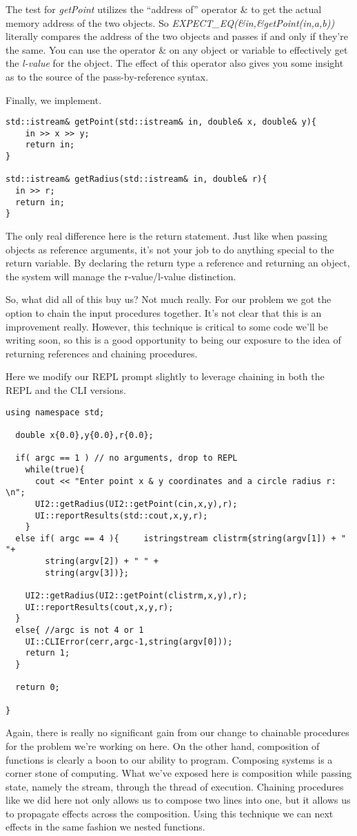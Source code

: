 \documentclass[]{tufte-handout}
\begin{document}
The test for \textit{getPoint} utilizes the ``address of'' operator \& to get the actual memory address of the two objects. So  \textit{EXPECT\_EQ(\&in,\&getPoint(in,a,b))} literally compares the address of the two objects and passes if and only if they're the same. You can use the operator \& on any object or variable to effectively get the \textit{l-value} for the object. The effect of this operator also gives you some insight as to the source of the pass-by-reference syntax. 

Finally, we implement.
\begin{verbatim}
std::istream& getPoint(std::istream& in, double& x, double& y){
    in >> x >> y;
    return in;
}

std::istream& getRadius(std::istream& in, double& r){
  in >> r;
  return in;
}
\end{verbatim}
The only real difference here is the return statement. Just like when passing objects as reference arguments, it's not your job to do anything special to the return variable. By declaring the return type a reference and returning an object, the system will manage the r-value/l-value distinction. 

So, what did all of this buy us? Not much really. For our problem we got the option to chain the input procedures together.  It's not clear that this is an improvement really. However, this technique is critical to some code we'll be writing soon, so this is a good opportunity to being our exposure to the idea of returning references and chaining procedures. 

Here we modify our REPL prompt slightly to leverage chaining in both the REPL and the CLI versions.
\begin{verbatim}
using namespace std;

  double x{0.0},y{0.0},r{0.0};

  if( argc == 1 ) // no arguments, drop to REPL
    while(true){
      cout << "Enter point x & y coordinates and a circle radius r: \n";
      UI2::getRadius(UI2::getPoint(cin,x,y),r);
      UI::reportResults(std::cout,x,y,r);
    }
  else if( argc == 4 ){     istringstream clistrm{string(argv[1]) + "  "+
        string(argv[2]) + " " +
        string(argv[3])};

    UI2::getRadius(UI2::getPoint(clistrm,x,y),r);
    UI::reportResults(cout,x,y,r);
  }
  else{ //argc is not 4 or 1
    UI::CLIError(cerr,argc-1,string(argv[0]));
    return 1;
  }

  return 0;

}
\end{verbatim}
Again, there is really no significant gain from our change to chainable procedures for the problem we're working on here.  On the other hand, composition of functions is clearly a boon to our ability to program. Composing systems is a corner stone of computing. What we've exposed here is composition while passing state, namely the stream, through the thread of execution.  Chaining procedures like we did here not only allows us to compose two lines into one, but it allows us to propagate effects across the composition. Using this technique we can next effects in the same fashion we nested functions. 
\end{document}
